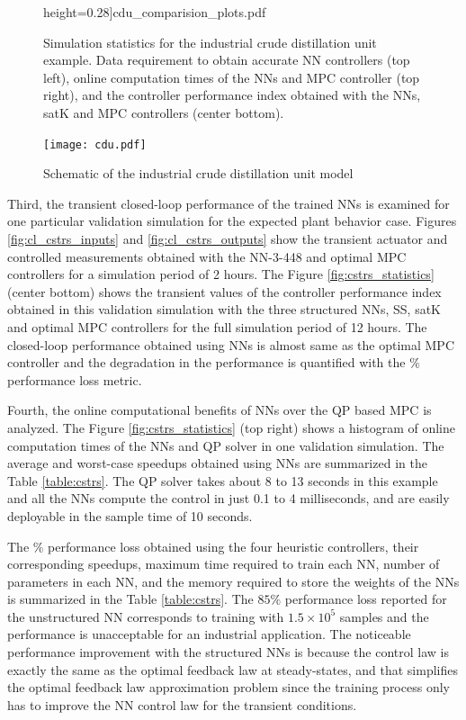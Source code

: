 \documentclass[preprint,5p, twocolumn, authoryear]{elsarticle}
\begin{document}
\begin{figure}[!h]
\begin{center}
        height=0.28\textheight]{cdu_comparision_plots.pdf}\end{center}
    \vspace{-0.2in}
    \caption{Simulation statistics for the industrial crude distillation unit
    example. Data requirement to obtain accurate NN controllers (top left),
    online computation times of the NNs and MPC controller (top right), and the
    controller performance index obtained with the NNs, satK and MPC controllers
    (center bottom).}	
    \label{fig:cdu_statistics}
\end{figure}

\begin{figure}[!h]
    \centering
    \texttt{[image: cdu.pdf]}
    \caption{Schematic of the industrial crude distillation unit model}
    \label{fig:schematic_cdu}
\end{figure}

Third, the transient closed-loop performance of the trained NNs is examined for
one particular validation simulation for the expected plant behavior case.
Figures \ref{fig:cl_cstrs_inputs} and \ref{fig:cl_cstrs_outputs} show the
transient actuator and controlled measurements obtained with the NN-3-448 and
optimal MPC controllers for a simulation period of 2 hours. The Figure
\ref{fig:cstrs_statistics} (center bottom) shows the transient values of the
controller performance index obtained in this validation simulation with the
three structured NNs, SS, satK and optimal MPC controllers for the full
simulation period of 12 hours. The closed-loop performance obtained using NNs is
almost same as the optimal MPC controller and the degradation in the performance
is quantified with the $\%$ performance loss metric.

Fourth, the online computational benefits of NNs over the QP based MPC is
analyzed. The Figure \ref{fig:cstrs_statistics} (top right) shows a histogram of
online computation times of the NNs and QP solver in one validation simulation.
The average and worst-case speedups obtained using NNs are summarized in the
Table \ref{table:cstrs}. The QP solver takes about 8 to 13 seconds in this
example and all the NNs compute the control in just 0.1 to 4 milliseconds, and
are easily deployable in the sample time of 10 seconds.

The $\%$ performance loss obtained using the four heuristic controllers, their
corresponding speedups, maximum time required to train each NN, number of
parameters in each NN, and the memory required to store  
the weights of the NNs is summarized in the Table \ref{table:cstrs}. The $85 \%$
performance loss reported for the unstructured NN corresponds to training with
$1.5 \times 10^5$ samples and the performance is unacceptable for an industrial
application. The noticeable performance improvement with the structured NNs is
because the control law is exactly the same as the optimal feedback law at
steady-states, and that simplifies the optimal feedback law approximation
problem since the training process only has to improve the NN control law for
the transient conditions. 
\end{document}
